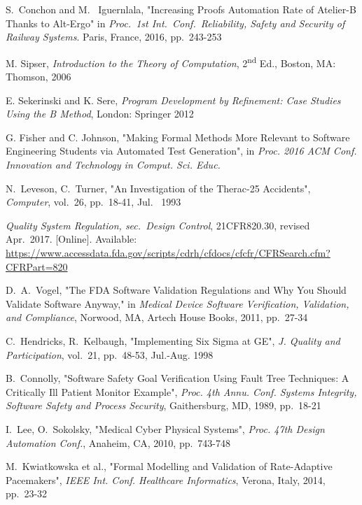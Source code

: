 \documentclass[12pt,journal,duplex]{IEEEtran}
\begin{document}
	\begin{thebibliography}{2}
		S.~Conchon and M.~ Iguernlala, "Increasing Proofs Automation Rate of Atelier-B Thanks to Alt-Ergo" in \emph{Proc.~1st Int.~Conf.~Reliability, Safety and Security of Railway Systems}. Paris, France, 2016, pp.~243-253

		M. Sipser, \emph{Introduction to the Theory of Computation}, 2\textsuperscript{nd} Ed., Boston, MA: Thomson, 2006

		E. Sekerinski and K. Sere, \emph{Program Development by Refinement: Case Studies Using the B Method}, London: Springer 2012

		G. Fisher and C. Johnson, "Making Formal Methods More Relevant to Software Engineering Students via Automated Test Generation", in \emph{Proc. 2016 ACM Conf. Innovation and Technology in Comput. Sci. Educ.}

		N.~Leveson, C.~Turner, "An Investigation of the Therac-25 Accidents", \emph{Computer}, vol.~26, pp.~18-41, Jul.~ 1993

		\emph{Quality System Regulation, sec.~Design Control}, 21CFR820.30, revised Apr.~2017. [Online]. Available:
		\url{https://www.accessdata.fda.gov/scripts/cdrh/cfdocs/cfcfr/CFRSearch.cfm?CFRPart=820}

		D.~A.~Vogel, "The FDA Software Validation Regulations and Why You Should Validate Software Anyway," in \emph{Medical Device Software Verification, Validation, and Compliance}, Norwood, MA, Artech House Books, 2011, pp.~27-34

		C.~Hendricks, R.~Kelbaugh, "Implementing Six Sigma at GE", \emph{J. Quality and Participation}, vol.~21, pp.~48-53, Jul.-Aug. 1998

		B.~Connolly, "Software Safety Goal Verification Using Fault Tree Techniques: A Critically Ill Patient Monitor Example", \emph{Proc. 4th Annu. Conf. Systems Integrity, Software Safety and Process Security}, Gaithersburg, MD, 1989, pp.~18-21

		I.~Lee, O.~Sokolsky, "Medical Cyber Physical Systems", \emph{Proc. 47th Design Automation Conf.}, Anaheim, CA, 2010, pp.~743-748

		M.~Kwiatkowska et al., "Formal Modelling and Validation of Rate-Adaptive Pacemakers", \emph{IEEE Int. Conf. Healthcare Informatics}, Verona, Italy, 2014, pp.~23-32


\end{thebibliography}
\end{document}
